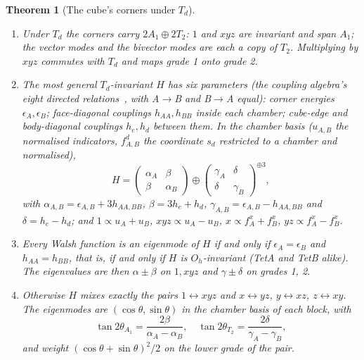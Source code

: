 \documentclass[twocolumn]{iopjournal}
\newtheorem{theorem}{Theorem}
\theoremstyle{definition}
\theoremstyle{remark}
\begin{document}
\begin{theorem}[The cube's corners under $T_d$]
\label{thm:pairing}
\begin{enumerate}
\item[(i)] Under $T_d$ the corners carry $2A_1 \oplus 2T_2$: $1$ and
  $xyz$ are invariant and span $A_1$; the vector modes and the bivector
  modes are each a copy of $T_2$. Multiplying by $xyz$ commutes with $T_d$
  and maps grade 1 onto grade 2.
\item[(ii)] The most general $T_d$-invariant $H$ has six parameters (the
  coupling algebra's eight directed relations~\cite{NelsonCoupling}, with
  A$\to$B and B$\to$A equal): corner energies $\epsilon_A, \epsilon_B$;
  face-diagonal couplings $h_{AA}, h_{BB}$ inside each chamber; cube-edge
  and body-diagonal couplings $h_e, h_d$ between them. In the chamber basis
  ($u_{A,B}$ the normalised indicators, $f^d_{A,B}$ the coordinate $s_d$
  restricted to a chamber and normalised),
  \begin{equation}
  H = \begin{pmatrix}\alpha_A & \beta\\ \beta & \alpha_B\end{pmatrix}
  \oplus
  \begin{pmatrix}\gamma_A & \delta\\ \delta & \gamma_B\end{pmatrix}^{\oplus 3},
  \label{eq:blocks}
  \end{equation}
  with $\alpha_{A,B} = \epsilon_{A,B} + 3h_{AA,BB}$, $\beta = 3h_e + h_d$,
  $\gamma_{A,B} = \epsilon_{A,B} - h_{AA,BB}$ and $\delta = h_e - h_d$;
  and $1 \propto u_A + u_B$, $xyz \propto u_A - u_B$, $x \propto f^x_A +
  f^x_B$, $yz \propto f^x_A - f^x_B$.
\item[(iii)] Every Walsh function is an eigenmode of $H$ if and only if
  $\epsilon_A = \epsilon_B$ and $h_{AA} = h_{BB}$, that is, if and only
  if $H$ is $O_h$-invariant (TetA and TetB alike). The eigenvalues are then
  $\alpha \pm \beta$ on $1, xyz$ and $\gamma \pm \delta$ on grades 1, 2.
\item[(iv)] Otherwise $H$ mixes exactly the pairs $1 \leftrightarrow xyz$
  and $x \leftrightarrow yz$, $y \leftrightarrow xz$, $z \leftrightarrow
  xy$. The eigenmodes are $(\cos\theta, \sin\theta)$ in the chamber basis
  of each block, with
  \begin{equation}
  \tan 2\theta_{A_1} = \frac{2\beta}{\alpha_A - \alpha_B},\quad
  \tan 2\theta_{T_2} = \frac{2\delta}{\gamma_A - \gamma_B},
  \label{eq:mixing}
  \end{equation}
  and weight $(\cos\theta + \sin\theta)^2/2$ on the lower grade of the pair.
\end{enumerate}
\end{theorem}
\end{document}
